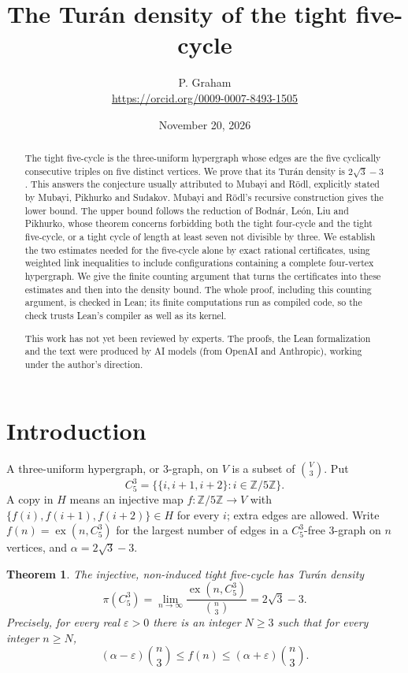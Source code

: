 \documentclass[11pt]{article}
\title{The Turán density of the tight five-cycle}
\author{P. Graham\\ \small\url{https://orcid.org/0009-0007-8493-1505}}
\date{November 20, 2026}
\newtheorem{theorem}{Theorem}
\DeclareMathOperator{\ex}{ex}
\newcommand{\Cfive}{C_5^3}
\begin{document}
\maketitle
\begin{abstract}
The tight five-cycle is the three-uniform hypergraph whose edges are the
five cyclically consecutive triples on five distinct vertices. We prove
that its Tur\'an density is $2\sqrt3-3$. This answers the conjecture usually
attributed to Mubayi and R\"odl, explicitly stated by Mubayi, Pikhurko and
Sudakov. Mubayi and R\"odl's recursive construction gives the lower bound.
The upper bound follows the reduction of Bodn\'ar, Le\'on, Liu and Pikhurko,
whose theorem concerns forbidding both the tight four-cycle and the tight
five-cycle, or a tight cycle of length at least seven not divisible by three. We establish the two
estimates needed for the five-cycle alone by exact rational certificates,
using weighted link inequalities to include configurations containing a
complete four-vertex hypergraph. We give the finite counting argument
that turns the certificates into these estimates and then into the density
bound. The whole proof, including this counting argument, is checked in Lean; its finite computations run as compiled code, so the check trusts Lean's compiler as well as its kernel.

This work has not yet been reviewed by experts.
The proofs, the Lean formalization and the text were produced by AI models
(from OpenAI and Anthropic), working under the author's direction.
\end{abstract}

\section{Introduction}
A three-uniform hypergraph, or $3$-graph, on $V$ is a subset of
$\binom V3$. Put
\[
 \Cfive=\bigl\{\{i,i+1,i+2\}:i\in\mathbb Z/5\mathbb Z\bigr\}.
\]
A copy in $H$ means an injective map $f:\mathbb Z/5\mathbb Z\to V$
with $\{f(i),f(i+1),f(i+2)\}\in H$ for every $i$; extra edges are allowed.
Write $f(n)=\ex(n,\Cfive)$ for the largest number of edges in a
$\Cfive$-free $3$-graph on $n$ vertices, and $\alpha=2\sqrt3-3$.

\begin{theorem}\label{thm:main}
The injective, non-induced tight five-cycle has Tur\'an density
\[
 \pi(\Cfive)=\lim_{n\to\infty}\frac{\ex(n,\Cfive)}{\binom n3}
 =2\sqrt3-3.
\]
Precisely, for every real $\varepsilon>0$ there is an integer $N\ge3$
such that for every integer $n\ge N$,
\[
 (\alpha-\varepsilon)\binom n3\le f(n)
 \le(\alpha+\varepsilon)\binom n3.
\]
\end{theorem}
\end{document}
